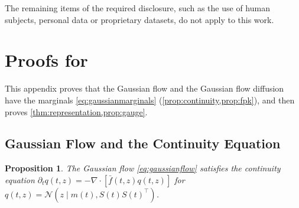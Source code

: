 \documentclass{article} %
\newcommand{\odedrift}{\bar f}
\newcommand{\Norm}{\mathcal{N}}
\newtheorem{proposition}[theorem]{Proposition}
\begin{document}
The remaining items of the required disclosure, such as the use of human subjects, personal data or proprietary datasets, do not apply to this work.
\fi






\appendix
\newpage
\section{Proofs for \texorpdfstring{}{Section 3}}\label{sec:proofs}

This appendix proves that the Gaussian flow and the Gaussian flow diffusion have the marginals \cref{eq:gaussianmarginals} (\cref{prop:continuity,prop:fpk}), and then proves \cref{thm:representation,prop:gauge}.

\subsection{Gaussian Flow and the Continuity Equation}\label{sec:proofcontinuity}

\begin{proposition}
\label{prop:continuity}
The Gaussian flow \cref{eq:gaussianflow} satisfies the continuity equation $\partial_t q(t, z) = -\nabla \cdot [\odedrift(t,z) q(t, z)]$ for $q(t, z) = \Norm(z \mid m(t), S(t)S(t)^\top)$.
\end{proposition}
\end{document}
